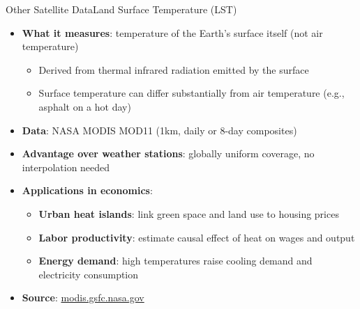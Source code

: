 \documentclass[hyperref={pdfpagelabels=false}]{beamer}
\begin{document}
\begin{frame}{Other Satellite Data}{Land Surface Temperature (LST)}
\begin{itemize}
    \item \textbf{What it measures}: temperature of the Earth's surface 
    itself (not air temperature)
    \vspace{0.2cm}
    \begin{itemize}
        \item Derived from thermal infrared radiation emitted by the surface
        \vspace{0.1cm}
        \item Surface temperature can differ substantially from 
        air temperature (e.g., asphalt on a hot day)
    \end{itemize}
    \vspace{0.2cm}
    \item \textbf{Data}: NASA MODIS MOD11 (1km, daily or 8-day composites)
    \vspace{0.2cm}
    \item \textbf{Advantage over weather stations}: 
    globally uniform coverage, no interpolation needed
    \vspace{0.2cm}
    \item \textbf{Applications in economics}:
    \vspace{0.1cm}
    \begin{itemize}
        \item \textbf{Urban heat islands}: link green space and 
        land use to housing prices
        \vspace{0.1cm}
        \item \textbf{Labor productivity}: estimate causal effect 
        of heat on wages and output
        \vspace{0.1cm}
        \item \textbf{Energy demand}: high temperatures raise 
        cooling demand and electricity consumption
    \end{itemize}
    \vspace{0.2cm}
    \item \textbf{Source}: 
    \href{https://modis.gsfc.nasa.gov/data/dataprod/}{modis.gsfc.nasa.gov}
\end{itemize}
\end{frame}
\end{document}
